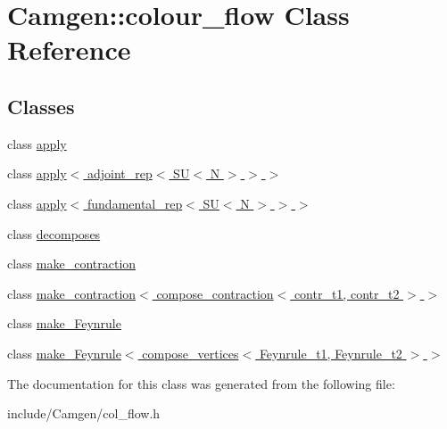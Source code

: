 \hypertarget{a00073}{}\section{Camgen\+:\+:colour\+\_\+flow Class Reference}
\label{a00073}
\subsection*{Classes}
\begin{DoxyCompactItemize}
\item 
class \hyperlink{a00014}{apply}
\item 
class \hyperlink{a00015}{apply$<$ adjoint\+\_\+rep$<$ S\+U$<$ N $>$ $>$ $>$}
\item 
class \hyperlink{a00016}{apply$<$ fundamental\+\_\+rep$<$ S\+U$<$ N $>$ $>$ $>$}
\item 
class \hyperlink{a00124}{decomposes}
\item 
class \hyperlink{a00342}{make\+\_\+contraction}
\item 
class \hyperlink{a00343}{make\+\_\+contraction$<$ compose\+\_\+contraction$<$ contr\+\_\+t1, contr\+\_\+t2 $>$ $>$}
\item 
class \hyperlink{a00345}{make\+\_\+\+Feynrule}
\item 
class \hyperlink{a00346}{make\+\_\+\+Feynrule$<$ compose\+\_\+vertices$<$ Feynrule\+\_\+t1, Feynrule\+\_\+t2 $>$ $>$}
\end{DoxyCompactItemize}


The documentation for this class was generated from the following file\+:\begin{DoxyCompactItemize}
\item 
include/\+Camgen/col\+\_\+flow.\+h\end{DoxyCompactItemize}
